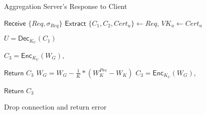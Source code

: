 \begin{algorithm}[t]
\small
\caption{Aggregation Server's Response to Client}
\label{proto-6}
\begin{algorithmic}[1]
    
\item[]
\begin{center}
\end{center}

\STATE $\mathsf{Receive}$  $\{Req, \sigma_{Req}\}$
\STATE $\mathsf{Extract}$ $\{C_1, C_2, Cert_u\} \leftarrow Req$, $VK_{u} \leftarrow Cert_{u}$

\STATE $U = \mathsf{Dec}_{K_U}(C_1)$
    
    
    \STATE $C_3 =  \mathsf{Enc}_{K_U}(W_G)$, 
    
    \STATE $\mathsf{Return}$ $C_3$  
        \STATE $W_G  = W_G -  \frac{1}{K}*(W_K^{Pre} - W_K)$
        \STATE $C_3 =  \mathsf{Enc}_{K_U}(W_G)$, 
    
        \STATE $\mathsf{Return}$ $C_3$          
    \ENDIF

\ELSE
    \STATE Drop connection and return error 
\ENDIF



\end{algorithmic}
\end{algorithm}








